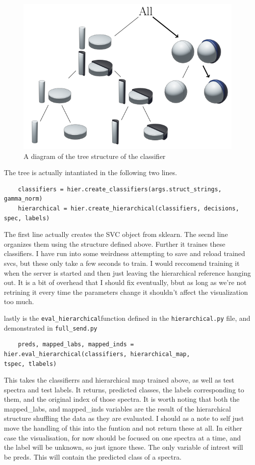 \documentclass{article}
\begin{document}
\begin{figure}
\includegraphics[width=\linewidth]{figs/abs-tree.png}
\caption{A diagram of the tree structure of the classifier}
\label{fig:tree}
\end{figure}

The tree is actually intantiated in the following two lines.

\begin{verbatim}
    classifiers = hier.create_classifiers(args.struct_strings, gamma_norm)
    hierarchical = hier.create_hierarchical(classifiers, decisions, spec, labels)
\end{verbatim}
The first line actually creates the SVC object from sklearn.
The secnd line organizes them using the structure defined above.
Further it traines these classifiers.  I have run into some weirdness attempting to save and reload trained svcs, but these only take a few seconds to train. 
I would reccomend training it when the server is started and then just leaving the hierarchical reference hanging out.  
It is a bit of overhead that I should fix eventually, bbut as long as we're not retrining it every time the parameters change it shouldn't affect the visualization too much.

lastly is the \texttt{eval\_hierarchical}function defined in the \texttt{hierarchical.py} file, and demonstrated in \texttt{full\_send.py}
\begin{verbatim}
    preds, mapped_labs, mapped_inds = hier.eval_hierarchical(classifiers, hierarchical_map, 
tspec, tlabels)
\end{verbatim}
This takes the classifierrs and hierarchical map trained above, as well as test spectra and test labels.
It returns, predicted classes, the labels corresponding to them, and the original index of those spectra.
It is worth noting that both the mapped\_labs, and mapped\_inds variables are the result of the hierarchical structure shuffling the data as they are evaluated.
I should as a note to self just move the handling of this into the funtion and not return these at all.
In either case the visualisation, for now should be focused on one spectra at a time, and the label will be unknown, so just ignore these. The only variable of intrest will be preds.
This will contain the predicted class of a spectra.
\end{document}
